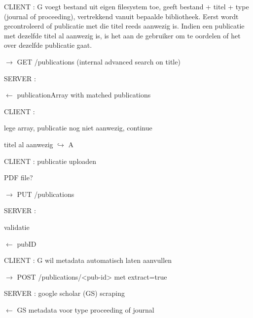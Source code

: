 \documentclass{article}
\begin{document}
\begin{description}
\item CLIENT : G voegt bestand uit eigen filesystem toe, geeft bestand + titel + type (journal of proceeding), vertrekkend vanuit bepaalde bibliotheek. Eerst wordt gecontroleerd of publicatie met die titel reeds aanwezig is. Indien een publicatie met dezelfde titel al aanwezig is, is het aan de gebruiker om te oordelen of het over dezelfde publicatie gaat. 
	\begin{description}
	\item $\rightarrow$ GET /publications (internal advanced search on title)
	\end{description}
	
\item SERVER : 
	\begin{description}
	\item $\leftarrow$ publicationArray with matched publications
	\end{description}
	 
\item CLIENT : 
	\begin{description}
	\item lege array, publicatie nog niet aanwezig, continue
	\item titel al aanwezig $\hookrightarrow$ A
	\end{description}

\item CLIENT : publicatie uploaden 
	\begin{description}
	\item \checkmark PDF file?
	\item $\rightarrow$ PUT /publications
	\end{description}
	
\item SERVER : 
\begin{description}
	\item \checkmark validatie
	\item $\leftarrow$ pubID
	\end{description}
	
\item CLIENT :  G wil metadata automatisch laten aanvullen
	\begin{description}
	\item $\rightarrow$  POST /publications/<pub-id> met extract=true
	\end{description}
	
\item SERVER :  google scholar (GS) scraping
	\begin{description}
	\item $\leftarrow$  GS metadata voor type proceeding of journal
	\end{description}
	

\end{description}
\end{document}
